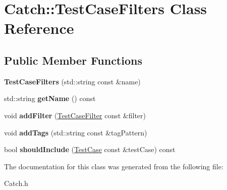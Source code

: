 \hypertarget{class_catch_1_1_test_case_filters}{\section{Catch\-:\-:Test\-Case\-Filters Class Reference}
\label{class_catch_1_1_test_case_filters}
}
\subsection*{Public Member Functions}
\begin{DoxyCompactItemize}
\item 
\hypertarget{class_catch_1_1_test_case_filters_aeaf3582868c07dfae6a31366c7964a92}{{\bfseries Test\-Case\-Filters} (std\-::string const \&name)}\label{class_catch_1_1_test_case_filters_aeaf3582868c07dfae6a31366c7964a92}

\item 
\hypertarget{class_catch_1_1_test_case_filters_a2acf97540f4fc9979a4c46068bc908d6}{std\-::string {\bfseries get\-Name} () const }\label{class_catch_1_1_test_case_filters_a2acf97540f4fc9979a4c46068bc908d6}

\item 
\hypertarget{class_catch_1_1_test_case_filters_a7f1ffd2e932d90a80d6dc6279ff9216d}{void {\bfseries add\-Filter} (\hyperlink{class_catch_1_1_test_case_filter}{Test\-Case\-Filter} const \&filter)}\label{class_catch_1_1_test_case_filters_a7f1ffd2e932d90a80d6dc6279ff9216d}

\item 
\hypertarget{class_catch_1_1_test_case_filters_a77d8212d883341c8de88d01f4c419d83}{void {\bfseries add\-Tags} (std\-::string const \&tag\-Pattern)}\label{class_catch_1_1_test_case_filters_a77d8212d883341c8de88d01f4c419d83}

\item 
\hypertarget{class_catch_1_1_test_case_filters_a8cb88af0aee7449c3409891948e51d3b}{bool {\bfseries should\-Include} (\hyperlink{class_catch_1_1_test_case}{Test\-Case} const \&test\-Case) const }\label{class_catch_1_1_test_case_filters_a8cb88af0aee7449c3409891948e51d3b}

\end{DoxyCompactItemize}


The documentation for this class was generated from the following file\-:\begin{DoxyCompactItemize}
\item 
Catch.\-h\end{DoxyCompactItemize}
